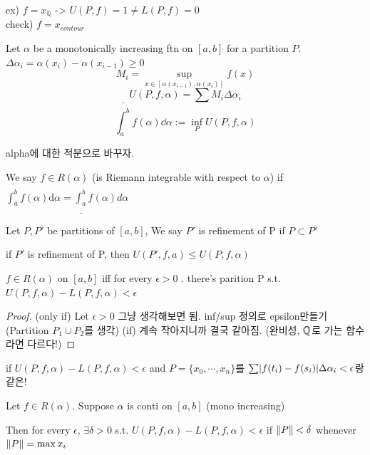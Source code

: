 \documentclass{article}
\begin{document}
ex) $f=x_{\mathbb{Q}}$ -> $U(P, f)=1 \neq L(P, f)=0$\\
check) $f=x_{contour}$

\begin{definition}
    Let $\alpha$ be a monotonically increasing ftn on $[a, b]$ for a partition $P$.\\$\Delta \alpha_i = \alpha(x_i)-\alpha(x_{i-1}) \geq 0$
    \[M_i=\sup_{x \in [\alpha(x_{i-1}), \alpha(x_{i})]} f(x)\]
    \[U(P, f, \alpha)=\sum M_i \Delta \alpha_i\]
    \[\overline{\int^b_a}f(\alpha)\dd\alpha := \inf_P U(P, f, \alpha)\]
\end{definition}

alpha에 대한 적분으로 바꾸자.

\begin{definition}
    We say $f \in R(\alpha)$ (is Riemann integrable with respect to $\alpha$) if $\overline{\int^b_a}f(\alpha)\text{d}\alpha=\underline{\int^b_a}f(\alpha)d\alpha$
\end{definition}

\begin{definition}
    Let $P, P'$ be partitions of $[a, b]$, We say $P'$ is refinement of P if $P \subset P'$
\end{definition}

\begin{theorem}
    if $P'$ is refinement of P, then $U(P', f, a) \leq U(P, f, \alpha)$
\end{theorem}

\begin{theorem}
    $f \in R(\alpha)$ on $[a, b]$ iff for every $\epsilon >0$ . there's parition P s.t. $U(P, f, \alpha)-L(P, f, \alpha) < \epsilon$
\end{theorem}
\begin{proof}
    (only if) Let $\epsilon>0$ 그냥 생각해보면 됨. inf/sup 정의로 epsilon만들기 (Partition $P_1 \cup P_2$를 생각)
    (if) 계속 작아지니까 결국 같아짐. (완비성, $\mathbb{Q}$로 가는 함수라면 다르다!)
\end{proof}

\begin{remark}
    if $U(P, f, \alpha)-L(P,f,\alpha)<\epsilon$ and $P=\{x_0, \cdots, x_n\}$를 $\sum \lvert f(t_i)-f(s_i)\rvert\Delta\alpha_i<\epsilon$랑 같은!
\end{remark}

\begin{theorem}
    Let $f\in R(\alpha)$. Suppose $\alpha$ is conti on $[a,b]$ (mono increasing)

    Then for every $\epsilon$, $\exists \delta >0$ s.t. $U(P, f, \alpha)-L(P, f, \alpha)<\epsilon$ if $\lVert P\rVert<\delta$
    whenever $\lVert P\rVert=\max x_i$
\end{theorem}
\end{document}
